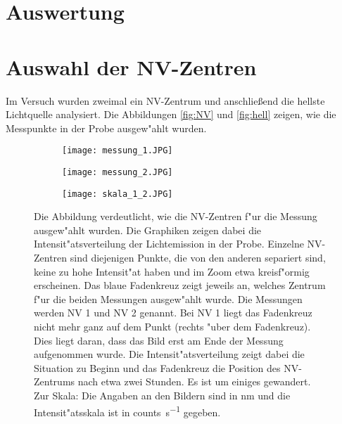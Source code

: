 \section{Auswertung}

\section{Auswahl der NV-Zentren}
Im Versuch wurden zweimal ein NV-Zentrum und anschlie\ss end die hellste Lichtquelle analysiert.
Die Abbildungen \vref{fig:NV} und \vref{fig:hell} zeigen, wie die Messpunkte in der Probe ausgew"ahlt wurden.
\begin{figure}[htbp]
    \begin{subfigure}[t][][b]{0.43\textwidth}
        \texttt{[image: messung\_1.JPG]}
        \label{fig:NV:1}
    \end{subfigure}
    \begin{subfigure}[t][][b]{0.42\textwidth}
        \texttt{[image: messung\_2.JPG]}
        \label{fig:NV:2}
    \end{subfigure}
    \hfill
    \begin{subfigure}[t][][b]{0.1\textwidth}
        \texttt{[image: skala\_1\_2.JPG]}
    \end{subfigure}
    \caption{
        Die Abbildung verdeutlicht, wie die NV-Zentren f"ur die Messung ausgew"ahlt wurden.
        Die Graphiken zeigen dabei die Intensit"atsverteilung der Lichtemission in der Probe.
        Einzelne NV-Zentren sind diejenigen Punkte, die von den anderen separiert sind, keine zu hohe Intensit"at haben und im Zoom etwa kreisf"ormig erscheinen.
        Das blaue Fadenkreuz zeigt jeweils an, welches Zentrum f"ur die beiden Messungen ausgew"ahlt wurde.
        Die Messungen werden NV 1 und NV 2 genannt.
        Bei NV 1 liegt das Fadenkreuz nicht mehr ganz auf dem Punkt (rechts "uber dem Fadenkreuz).
        Dies liegt daran, dass das Bild erst am Ende der Messung aufgenommen wurde.
        Die Intensit"atsverteilung zeigt dabei die Situation zu Beginn und das Fadenkreuz die Position des NV-Zentrums nach etwa zwei Stunden.
        Es ist um einiges gewandert.
        \\
        Zur Skala: Die Angaben an den Bildern sind in \si{\nano\metre} und die Intensit"atsskala ist in \si{counts\per\second} gegeben.
        }
    \label{fig:NV}
\end{figure}
